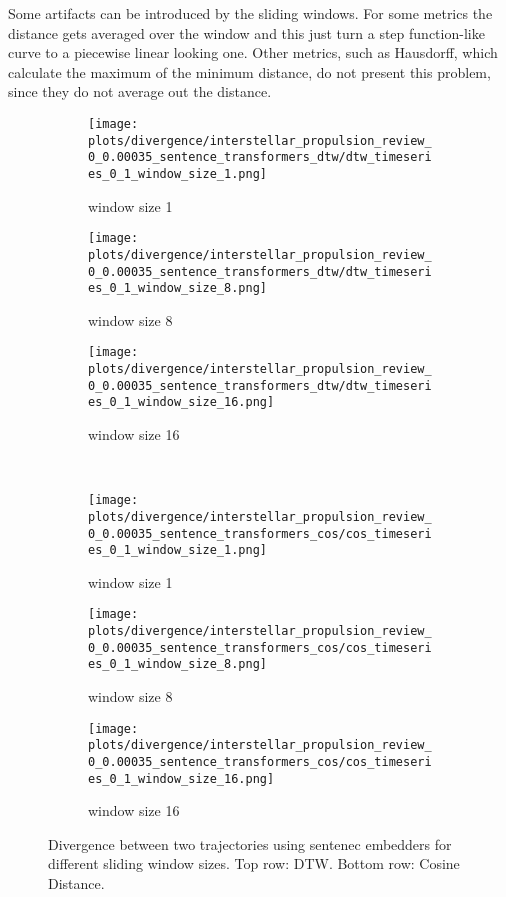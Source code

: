 \documentclass[a4paper,12pt]{article}
\begin{document}
Some artifacts can be introduced by the sliding windows. For some metrics the distance gets averaged over the window and this just turn a step function-like curve to a piecewise linear looking one.
Other metrics, such as Hausdorff, which calculate the maximum of the minimum distance, do not present this problem, since they do not average out the distance.
\begin{figure}[H]
    \centering
    \begin{subfigure}[b]{0.32\textwidth}
        \centering
        \texttt{[image: plots/divergence/interstellar\_propulsion\_review\_0\_0.00035\_sentence\_transformers\_dtw/dtw\_timeseries\_0\_1\_window\_size\_1.png]}
        \caption{window size 1}
    \end{subfigure}
    \begin{subfigure}[b]{0.32\textwidth}
        \centering
        \texttt{[image: plots/divergence/interstellar\_propulsion\_review\_0\_0.00035\_sentence\_transformers\_dtw/dtw\_timeseries\_0\_1\_window\_size\_8.png]}
        \caption{window size 8}
    \end{subfigure}
    \begin{subfigure}[b]{0.32\textwidth}
        \centering
        \texttt{[image: plots/divergence/interstellar\_propulsion\_review\_0\_0.00035\_sentence\_transformers\_dtw/dtw\_timeseries\_0\_1\_window\_size\_16.png]}
        \caption{window size 16}
    \end{subfigure}
    \\[0.5em]
    \begin{subfigure}[b]{0.32\textwidth}
        \centering
        \texttt{[image: plots/divergence/interstellar\_propulsion\_review\_0\_0.00035\_sentence\_transformers\_cos/cos\_timeseries\_0\_1\_window\_size\_1.png]}
        \caption{window size 1}
    \end{subfigure}
    \begin{subfigure}[b]{0.32\textwidth}
        \centering
        \texttt{[image: plots/divergence/interstellar\_propulsion\_review\_0\_0.00035\_sentence\_transformers\_cos/cos\_timeseries\_0\_1\_window\_size\_8.png]}
        \caption{window size 8}
    \end{subfigure}
    \begin{subfigure}[b]{0.32\textwidth}
        \centering
        \texttt{[image: plots/divergence/interstellar\_propulsion\_review\_0\_0.00035\_sentence\_transformers\_cos/cos\_timeseries\_0\_1\_window\_size\_16.png]}
        \caption{window size 16}
    \end{subfigure}
    \caption{Divergence between two trajectories using sentenec embedders for different sliding window sizes. Top row: DTW. Bottom row: Cosine Distance.}
    \label{fig:sliding_window_artifact}
\end{figure}
\end{document}
